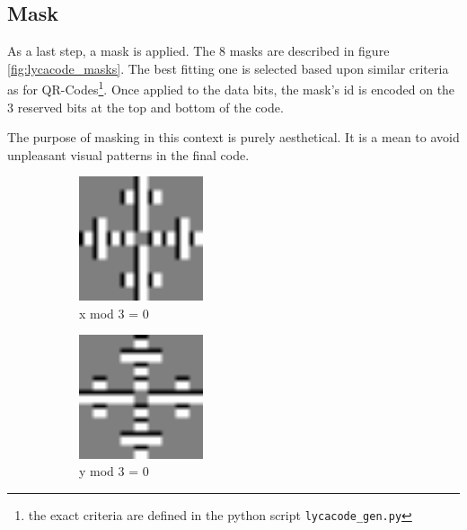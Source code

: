 \subsection{Mask}
\label{ssec:lycacode_ex_mask}

As a last step, a mask is applied. The 8 masks are described in figure \ref{fig:lycacode_masks}. The best fitting one is selected based upon similar criteria as for QR-Codes\footnote{the exact criteria are defined in the python script \texttt{lycacode\_gen.py}}. Once applied to the data bits, the mask's id is encoded on the 3 reserved bits at the top and bottom of the code.

The purpose of masking in this context is purely aesthetical. It is a mean to avoid unpleasant visual patterns in the final code.

\begin{figure}[H]
  \centering
  \begin{subfigure}{0.4\textwidth}
    \centering
    \includegraphics[width=0.4\textwidth]{images/lycacode_mask_0}
    \caption{x mod 3 = 0}
    \label{fig:lycacode_mask_0}
  \end{subfigure}
  \begin{subfigure}{0.4\textwidth}
    \centering
    \includegraphics[width=0.4\textwidth]{images/lycacode_mask_1}
    \caption{y mod 3 = 0}
    \label{fig:lycacode_mask_1}
  \end{subfigure}
  \begin{subfigure}{0.4\textwidth}
    \centering

\end{subfigure}
\end{figure}

